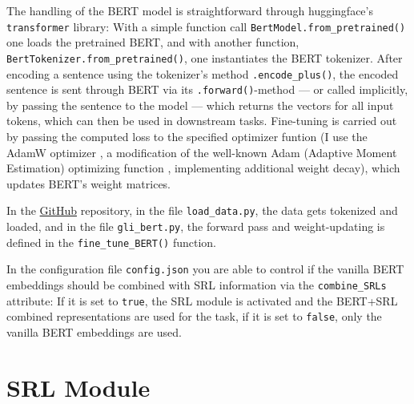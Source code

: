 The handling of the BERT model is straightforward through huggingface's \texttt{transformer}
library: With a simple function call \texttt{BertModel.from\_pretrained()} one loads the
pretrained BERT, and with another function, \texttt{BertTokenizer.from\_pretrained()},
one instantiates the BERT tokenizer.
After encoding a sentence using the tokenizer's method \texttt{.encode\_plus()}, the
encoded sentence is sent through BERT via its \texttt{.forward()}-method --- or
called implicitly, by passing the sentence to the model --- which returns the
vectors for all input tokens, which can then be used in downstream tasks. Fine-tuning
is carried out by passing the computed loss to the specified optimizer funtion (I use the
AdamW optimizer \citep{loshchilov2019decoupled}, a modification of the well-known
Adam (Adaptive Moment Estimation) optimizing function \citep{kingma2014adam}, implementing
additional weight decay), which updates BERT's weight matrices.

\begin{tcolorbox}[
  colback=blue!5!white,
  colframe=blue!75!black,
  title={\centering Code}]

  In the \href{https://github.com/JonathanSchaber/Masterarbeit}{GitHub} repository, in
  the file \texttt{load\_data.py}, the data gets tokenized and loaded, and in
  the file \texttt{gli\_bert.py}, the forward pass and weight-updating is
  defined in the \texttt{fine\_tune\_BERT()} function.

  In the configuration file \texttt{config.json} you are able to control if the vanilla BERT
  embeddings should be combined with SRL information via the \texttt{combine\_SRLs} attribute:
  If it is set to \texttt{true}, the SRL module is activated and the BERT+SRL combined
  representations are used for the task, if it is set to \texttt{false}, only the vanilla
  BERT embeddings are used.

\end{tcolorbox}




\section{SRL Module}
\label{sec:srl-module}

